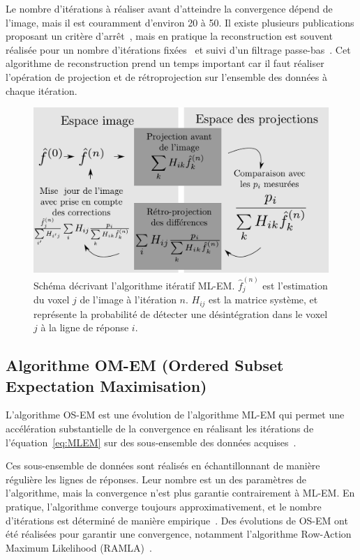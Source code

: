 Le nombre d'itérations à réaliser avant d'atteindre la convergence dépend de l'image, mais il est couramment d'environ 20 à 50. Il existe plusieurs publications proposant un critère d'arrêt~\cite{bissantz2006multi}, mais en pratique la reconstruction est souvent réalisée pour un nombre d'itérations fixées~\cite{bailey2005positon} et  suivi d'un filtrage passe-bas~\cite{daube2001application}. Cet algorithme de reconstruction prend un temps important car il faut réaliser l'opération de projection et de rétroprojection sur l'ensemble des données à chaque itération.

\begin{figure}
\centering
\includegraphics[width=12cm]{images/MLEM}
\caption[Schéma de principe de l'algorithme MLEM]{Schéma décrivant l'algorithme itératif ML-EM. $\hat{f}^{(n)}_j$ est l'estimation du voxel $j$ de l'image à l'itération $n$. $H_{ij}$ est la matrice système, et représente la probabilité de détecter une désintégration dans le voxel $j$ à la ligne de réponse $i$.}
\label{fig:schemaMLEM}
\end{figure}


	\subsection{Algorithme OM-EM (Ordered Subset Expectation Maximisation)}

L'algorithme OS-EM est une évolution de l'algorithme ML-EM  qui permet une accélération substantielle de la convergence en réalisant les itérations de l'équation~\ref{eq:MLEM} sur des sous-ensemble des données acquises~\cite{hudson1994accelerated}. 

Ces sous-ensemble de données sont réalisés en échantillonnant de manière régulière les lignes de réponses. Leur nombre est un des paramètres de l'algorithme, mais la convergence n'est plus garantie contrairement à ML-EM. En pratique, l'algorithme converge toujours approximativement, et le nombre d'itérations est déterminé de manière empirique~\cite{bailey2005positon}. Des évolutions de OS-EM ont été réalisées pour garantir une convergence, notamment l'algorithme Row-Action Maximum Likelihood (RAMLA)~\cite{browne1996row, chiang2004clinical}.

